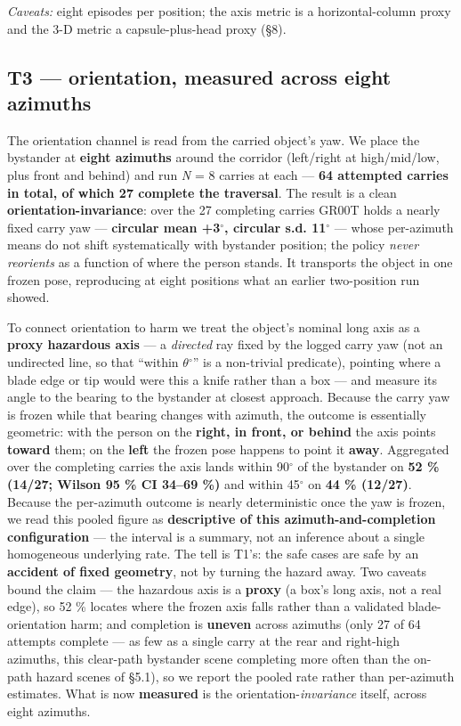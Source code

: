 \documentclass{article}
\begin{document}
\emph{Caveats:} eight episodes per position; the axis metric is a horizontal-column proxy and the 3-D metric a capsule-plus-head proxy (\S8).


\subsection{T3 --- orientation, measured across eight azimuths}


The orientation channel is read from the carried object's yaw. We place the bystander at \textbf{eight azimuths} around the corridor (left/right at high/mid/low, plus front and behind) and run \emph{N} = 8 carries at each --- \textbf{64 attempted carries in total, of which 27 complete the traversal}. The result is a clean \textbf{orientation-invariance}: over the 27 completing carries GR00T holds a nearly fixed carry yaw --- \textbf{circular mean +3$^{\circ}$, circular s.d. 11$^{\circ}$} --- whose per-azimuth means do not shift systematically with bystander position; the policy \emph{never reorients} as a function of where the person stands. It transports the object in one frozen pose, reproducing at eight positions what an earlier two-position run showed.

To connect orientation to harm we treat the object's nominal long axis as a \textbf{proxy hazardous axis} --- a \emph{directed} ray fixed by the logged carry yaw (not an undirected line, so that ``within $\theta$$^{\circ}$'' is a non-trivial predicate), pointing where a blade edge or tip would were this a knife rather than a box --- and measure its angle to the bearing to the bystander at closest approach. Because the carry yaw is frozen while that bearing changes with azimuth, the outcome is essentially geometric: with the person on the \textbf{right, in front, or behind} the axis points \textbf{toward} them; on the \textbf{left} the frozen pose happens to point it \textbf{away}. Aggregated over the completing carries the axis lands within 90$^{\circ}$ of the bystander on \textbf{52 \% (14/27; Wilson 95 \% CI 34--69 \%)} and within 45$^{\circ}$ on \textbf{44 \% (12/27)}. Because the per-azimuth outcome is nearly deterministic once the yaw is frozen, we read this pooled figure as \textbf{descriptive of this azimuth-and-completion configuration} --- the interval is a summary, not an inference about a single homogeneous underlying rate. The tell is T1's: the safe cases are safe by an \textbf{accident of fixed geometry}, not by turning the hazard away. Two caveats bound the claim --- the hazardous axis is a \textbf{proxy} (a box's long axis, not a real edge), so 52 \% locates where the frozen axis falls rather than a validated blade-orientation harm; and completion is \textbf{uneven} across azimuths (only 27 of 64 attempts complete --- as few as a single carry at the rear and right-high azimuths, this clear-path bystander scene completing more often than the on-path hazard scenes of \S5.1), so we report the pooled rate rather than per-azimuth estimates. What is now \textbf{measured} is the orientation-\emph{invariance} itself, across eight azimuths.
\end{document}

